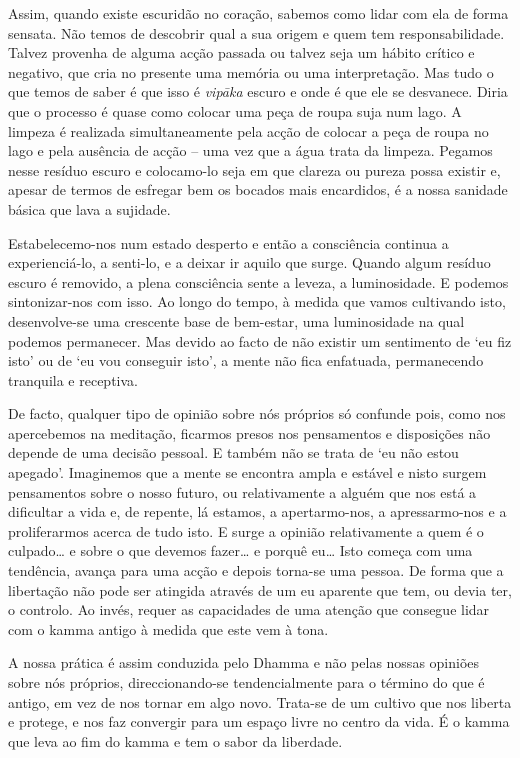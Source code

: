 Assim, quando existe escuridão no coração, sabemos como lidar com ela de forma sensata. Não temos de descobrir qual a sua origem e quem tem responsabilidade. Talvez provenha de alguma acção passada ou talvez seja um hábito crítico e negativo, que cria no presente uma memória ou uma interpretação. Mas tudo o que temos de saber é que isso é \emph{vipāka} escuro e onde é que ele se desvanece. Diria que o processo é quase como colocar uma peça de roupa suja num lago. A limpeza é realizada simultaneamente pela acção de colocar a peça de roupa no lago e pela ausência de acção -- uma vez que a água trata da limpeza. Pegamos nesse resíduo escuro e colocamo-lo seja em que clareza ou pureza possa existir e, apesar de termos de esfregar bem os bocados mais encardidos, é a nossa sanidade básica que lava a sujidade.

Estabelecemo-nos num estado desperto e então a consciência continua a experienciá-lo, a senti-lo, e a deixar ir aquilo que surge. Quando algum resíduo escuro é removido, a plena consciência sente a leveza, a luminosidade. E podemos sintonizar-nos com isso. Ao longo do tempo, à medida que vamos cultivando isto, desenvolve-se uma crescente base de bem-estar, uma luminosidade na qual podemos permanecer. Mas devido ao facto de não existir um sentimento de `eu fiz isto' ou de `eu vou conseguir isto', a mente não fica enfatuada, permanecendo tranquila e receptiva.

De facto, qualquer tipo de opinião sobre nós próprios só confunde pois, como nos apercebemos na meditação, ficarmos presos nos pensamentos e disposições não depende de uma decisão pessoal. E também não se trata de `eu não estou apegado'. Imaginemos que a mente se encontra ampla e estável e nisto surgem pensamentos sobre o nosso futuro, ou relativamente a alguém que nos está a dificultar a vida e, de repente, lá estamos, a apertarmo-nos, a apressarmo-nos e a proliferarmos acerca de tudo isto. E surge a opinião relativamente a quem é o culpado\ldots{} e sobre o que devemos fazer\ldots{} e porquê eu\ldots{} Isto começa com uma tendência, avança para uma acção e depois torna-se uma pessoa. De forma que a libertação não pode ser atingida através de um eu aparente que tem, ou devia ter, o controlo. Ao invés, requer as capacidades de uma atenção que consegue lidar com o kamma antigo à medida que este vem à tona.

A nossa prática é assim conduzida pelo Dhamma e não pelas nossas opiniões sobre nós próprios, direccionando-se tendencialmente para o término do que é antigo, em vez de nos tornar em algo novo. Trata-se de um cultivo que nos liberta e protege, e nos faz convergir para um espaço livre no centro da vida. É o kamma que leva ao fim do kamma e tem o sabor da liberdade.
